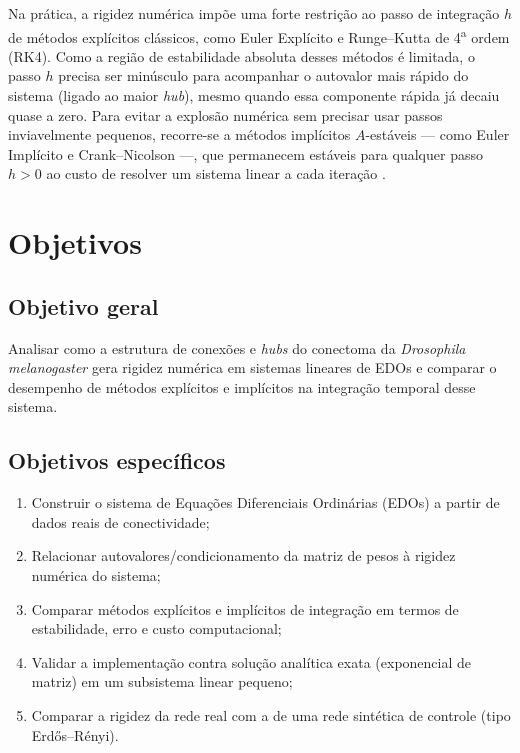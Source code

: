 \documentclass[12pt,a4paper]{article}
\begin{document}
Na prática, a rigidez numérica impõe uma forte restrição ao passo de integração $h$ de métodos explícitos clássicos, como Euler Explícito e Runge--Kutta de 4\textsuperscript{a} ordem (RK4). Como a região de estabilidade absoluta desses métodos é limitada, o passo $h$ precisa ser minúsculo para acompanhar o autovalor mais rápido do sistema (ligado ao maior \textit{hub}), mesmo quando essa componente rápida já decaiu quase a zero. Para evitar a explosão numérica sem precisar usar passos inviavelmente pequenos, recorre-se a métodos implícitos $A$-estáveis --- como Euler Implícito e Crank--Nicolson ---, que permanecem estáveis para qualquer passo $h > 0$ ao custo de resolver um sistema linear a cada iteração \cite{burden2016,hairer1996}.

\section{Objetivos}

\subsection{Objetivo geral}
Analisar como a estrutura de conexões e \textit{hubs} do conectoma da \textit{Drosophila melanogaster} gera rigidez numérica em sistemas lineares de EDOs e comparar o desempenho de métodos explícitos e implícitos na integração temporal desse sistema.

\subsection{Objetivos específicos}
\begin{enumerate}[label=(\alph*)]
    \item Construir o sistema de Equações Diferenciais Ordinárias (EDOs) a partir de dados reais de conectividade;
    \item Relacionar autovalores/condicionamento da matriz de pesos à rigidez numérica do sistema;
    \item Comparar métodos explícitos e implícitos de integração em termos de estabilidade, erro e custo computacional;
    \item Validar a implementação contra solução analítica exata (exponencial de matriz) em um subsistema linear pequeno;
    \item Comparar a rigidez da rede real com a de uma rede sintética de controle (tipo Erd\H{o}s--Rényi).
\end{enumerate}
\end{document}
